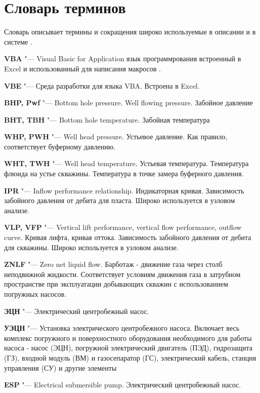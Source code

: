 \chapter*{Словарь терминов}             %

Словарь описывает термины и сокращения широко используемые в описании и в системе \unf.


\textbf{VBA} "--- Visual Basic for Application язык программрования встроенный в Excel и использованный для написания макросов \unf.

\textbf{VBE} "--- Среда разработки для языка VBA. Встроена в Excel.

\textbf{BHP, Pwf} "--- Bottom hole pressure. Well flowing pressure. Забойное давление

\textbf{BHT, TBH} "--- Bottom hole temperature. Забойная температура

\textbf{WHP, PWH} "--- Well head pressure. Устьевое давление. Как правило, соответствует буферному давлению.

\textbf{WHT, TWH} "--- Well head temperature. Устьевая температура. Температура флюида на устье скважины. Температура в точке замера буферного давления.

\textbf{IPR} "--- Inflow performance relationship. Индикаторная кривая. Зависимость забойного давления от дебита для пласта. Широко используется в узловом анализе.

\textbf{VLP, VFP} "--- Vertical lift performance, vertical flow performance, outflow curve. Кривая лифта, кривая оттока. Зависимость забойного давления от дебита для скважины. Широко используется в узловом анализе.

\textbf{ZNLF} "--- Zero net liquid flow. Барботаж - движение газа через столб неподвижной жидкости. Соответствует условиям движения газа в затрубном пространстве при эксплуатации добывающих скважин с использованием погружных насосов.

\textbf{ЭЦН} "--- Электрический центробежный насос.

\textbf{УЭЦН} "--- Установка электрического центробежного насоса. Включает весь комплекс погружного и поверхностного оборудования необходимого для работы насоса - насос (ЭЦН), погружной электрический двигатель (ПЭД), гидрозащита (ГЗ), входной модуль (ВМ) и газосепаратор (ГС), электрический кабель, станция управления (СУ) и другие элементы

\textbf{ESP} "--- Electrical submersible pump. Электрический центробежный насос.

